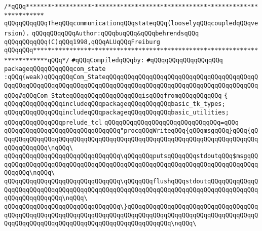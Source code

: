 \label{src/lib/tk/src/com-state.pkg}
\verb|/*qQQq***************************************************************************|\newline
\verb|qQQqqQQqqQQqTheqQQqcommunicationqQQqstateqQQq(looselyqQQqcoupledqQQqversion).|\newline
\verb|qQQqqQQqqQQqAuthor:qQQqbuqQQq&qQQqbehrendsqQQq|\newline
\verb|qQQqqQQqqQQq(C)qQQq1998,qQQqALUqQQqFreiburg|\newline
\verb|qQQqqQQq**************************************************************************qQQq*/|\newline
\newline
\verb|#qQQqCompiledqQQqby:|\newline
\verb|#qQQqqQQqqQQqqQQqqQQq|\newline
\newline
\verb|packageqQQqqQQqqQQqcom_state|\newline
\verb|:qQQq(weak)qQQqqQQqCom_StateqQQqqQQqqQQqqQQqqQQqqQQqqQQqqQQqqQQqqQQqqQQqqQQqqQQqqQQqqQQqqQQqqQQqqQQqqQQqqQQqqQQqqQQqqQQqqQQqqQQqqQQqqQQqqQQqqQQq#qQQqCom_StateqQQqqQQqqQQqqQQqqQQqisqQQqfromqQQqqQQqqQQq|\newline
\verb|{|\newline
\verb|qQQqqQQqqQQqqQQqincludeqQQqpackageqQQqqQQqqQQqbasic_tk_types;|\newline
\verb|qQQqqQQqqQQqqQQqincludeqQQqpackageqQQqqQQqqQQqbasic_utilities;|\newline
\newline
\verb|qQQqqQQqqQQqqQQqprelude_tcl|\newline
\verb|qQQqqQQqqQQqqQQqqQQqqQQqqQQqqQQq=qQQq|\newline
\verb|qQQqqQQqqQQqqQQqqQQqqQQqqQQqqQQq"procqQQqWriteqQQq{qQQqmsgqQQq}qQQq{qQQqqQQqqQQqqQQqqQQqqQQqqQQqqQQqqQQqqQQqqQQqqQQqqQQqqQQqqQQqqQQqqQQqqQQqqQQqqQQqqQQq\nqQQq\|\newline
\verb|qQQqqQQqqQQqqQQqqQQqqQQqqQQqqQQq\qQQqqQQqputsqQQqqQQqstdoutqQQq$msgqQQqqQQqqQQqqQQqqQQqqQQqqQQqqQQqqQQqqQQqqQQqqQQqqQQqqQQqqQQqqQQqqQQqqQQqqQQqqQQq\nqQQq\|\newline
\verb|qQQqqQQqqQQqqQQqqQQqqQQqqQQqqQQq\qQQqqQQqflushqQQqstdoutqQQqqQQqqQQqqQQqqQQqqQQqqQQqqQQqqQQqqQQqqQQqqQQqqQQqqQQqqQQqqQQqqQQqqQQqqQQqqQQqqQQqqQQqqQQqqQQqqQQq\nqQQq\|\newline
\verb|qQQqqQQqqQQqqQQqqQQqqQQqqQQqqQQq\}qQQqqQQqqQQqqQQqqQQqqQQqqQQqqQQqqQQqqQQqqQQqqQQqqQQqqQQqqQQqqQQqqQQqqQQqqQQqqQQqqQQqqQQqqQQqqQQqqQQqqQQqqQQqqQQqqQQqqQQqqQQqqQQqqQQqqQQqqQQqqQQqqQQqqQQq\nqQQq\|\newline
